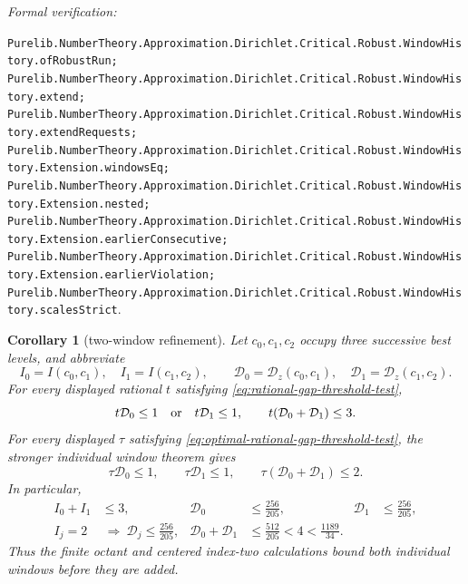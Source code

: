 \documentclass[11pt]{article}
\newtheorem{corollary}[corollary]{Corollary}
\newcommand{\leanref}[1]{\par\smallskip\noindent
  \emph{Formal verification:}\par\nobreak
  {\raggedright\nolinkurl{#1}.\par}}
\begin{document}
\leanref{Purelib.NumberTheory.Approximation.Dirichlet.Critical.Robust.WindowHistory.ofRobustRun;
Purelib.NumberTheory.Approximation.Dirichlet.Critical.Robust.WindowHistory.extend;
Purelib.NumberTheory.Approximation.Dirichlet.Critical.Robust.WindowHistory.extendRequests;
Purelib.NumberTheory.Approximation.Dirichlet.Critical.Robust.WindowHistory.Extension.windowsEq;
Purelib.NumberTheory.Approximation.Dirichlet.Critical.Robust.WindowHistory.Extension.nested;
Purelib.NumberTheory.Approximation.Dirichlet.Critical.Robust.WindowHistory.Extension.earlierConsecutive;
Purelib.NumberTheory.Approximation.Dirichlet.Critical.Robust.WindowHistory.Extension.earlierViolation;
Purelib.NumberTheory.Approximation.Dirichlet.Critical.Robust.WindowHistory.scalesStrict}

\begin{corollary}[two-window refinement]
\label{cor:two-dirichlet-windows}
Let $c_0,c_1,c_2$ occupy three successive best levels, and abbreviate
\[
 I_0=I(c_0,c_1),\quad I_1=I(c_1,c_2),\qquad
 \mathcal D_0=\mathcal D_z(c_0,c_1),\quad
 \mathcal D_1=\mathcal D_z(c_1,c_2).
\]
For every displayed rational $t$ satisfying
\eqref{eq:rational-gap-threshold-test},
\begin{equation}
\label{eq:two-dirichlet-window-threshold}
 t\mathcal D_0\le1\quad\hbox{or}\quad t\mathcal D_1\le1,
 \qquad
 t(\mathcal D_0+\mathcal D_1)\le3.
\end{equation}
For every displayed $\tau$ satisfying
\eqref{eq:optimal-rational-gap-threshold-test}, the stronger individual
window theorem gives
\begin{equation}
\label{eq:two-dirichlet-window-optimal-threshold}
 \tau\mathcal D_0\le1,\qquad
 \tau\mathcal D_1\le1,\qquad
 \tau(\mathcal D_0+\mathcal D_1)\le2.
\end{equation}
In particular,
\begin{equation}
\label{eq:two-dirichlet-window-bound}
 \begin{aligned}
 I_0+I_1&\le3, &
 \mathcal D_0&\le\frac{256}{205}, &
 \mathcal D_1&\le\frac{256}{205},\\
 I_j=2&\ \Longrightarrow\
   \mathcal D_j\le\frac{256}{205}, &
 \mathcal D_0+\mathcal D_1&\le\frac{512}{205}<4
   <\frac{1189}{34}.
 \end{aligned}
\end{equation}
Thus the finite octant and centered index-two calculations bound both
individual windows before they are added.
\end{corollary}
\end{document}
